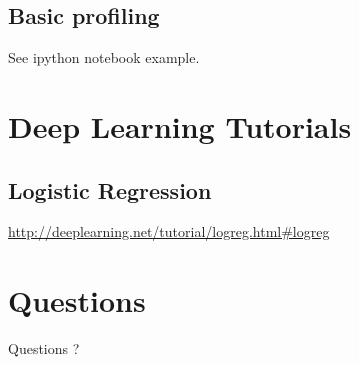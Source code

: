 \documentclass[9pt]{beamer}
\begin{document}
\subsection{Basic profiling}
\begin{frame}
    \begin{center}
    See ipython notebook example.
    \end{center}
\end{frame}
\section{Deep Learning Tutorials}
\subsection{Logistic Regression}
\begin{frame}
    \url{http://deeplearning.net/tutorial/logreg.html\#logreg}
\end{frame}
\section{Questions}
\begin{frame}
    \begin{center}
    {\Huge Questions ? }
    \end{center}
\end{frame}
\end{document}
